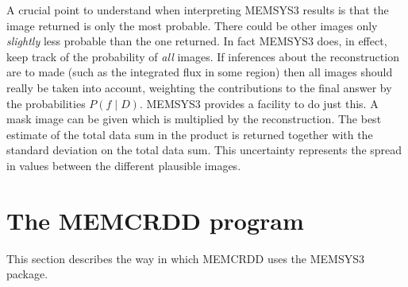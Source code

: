 A crucial point to understand when interpreting MEMSYS3 results is that the 
image returned is only the most probable. There could be other images only 
{\em slightly} less probable than the one returned. In fact MEMSYS3 does, in 
effect, keep track of the probability of {\em all} images. If inferences about 
the reconstruction are to made (such as the integrated flux in some region)
then all images should really be taken into account, weighting the
contributions to the final answer by the probabilities $P( f \mid D)$. MEMSYS3
provides a facility to do just this. A mask image can be given which is
multiplied by the reconstruction. The best estimate of the total data sum in
the product is returned together with the standard deviation on the total data
sum. This uncertainty represents the spread in values between the different
plausible images. 

\section {The MEMCRDD program}
This section describes the way in which MEMCRDD uses the MEMSYS3 package.

